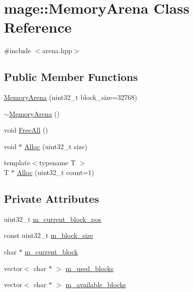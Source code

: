\hypertarget{classmage_1_1_memory_arena}{}\section{mage\+:\+:Memory\+Arena Class Reference}
\label{classmage_1_1_memory_arena}


{\ttfamily \#include $<$arena.\+hpp$>$}

\subsection*{Public Member Functions}
\begin{DoxyCompactItemize}
\item 
\hyperlink{classmage_1_1_memory_arena_aa243c458adb14e211f4dd944c4c82148}{Memory\+Arena} (uint32\+\_\+t block\+\_\+size=32768)
\item 
\hyperlink{classmage_1_1_memory_arena_acfee6fc205e2eaf6aeef4acf19948e6e}{$\sim$\+Memory\+Arena} ()
\item 
void \hyperlink{classmage_1_1_memory_arena_a30452ffc5813f5c62232713020fbe405}{Free\+All} ()
\item 
void $\ast$ \hyperlink{classmage_1_1_memory_arena_a01e00ac6e109249bd80a1e9e79eb0b28}{Alloc} (uint32\+\_\+t size)
\item 
{\footnotesize template$<$typename T $>$ }\\T $\ast$ \hyperlink{classmage_1_1_memory_arena_a16431dbfc49ddaee803fb0ab52303302}{Alloc} (uint32\+\_\+t count=1)
\end{DoxyCompactItemize}
\subsection*{Private Attributes}
\begin{DoxyCompactItemize}
\item 
uint32\+\_\+t \hyperlink{classmage_1_1_memory_arena_a3874097398455749a85fe50a9e4984c0}{m\+\_\+current\+\_\+block\+\_\+pos}
\item 
const uint32\+\_\+t \hyperlink{classmage_1_1_memory_arena_a41e318a8b32a9027e83aec25f09b3134}{m\+\_\+block\+\_\+size}
\item 
char $\ast$ \hyperlink{classmage_1_1_memory_arena_a13eba6e2a9f8d9db2df5674aa7ce0428}{m\+\_\+current\+\_\+block}
\item 
vector$<$ char $\ast$ $>$ \hyperlink{classmage_1_1_memory_arena_affb37aae6087014287b43d50521dd0fb}{m\+\_\+used\+\_\+blocks}
\item 
vector$<$ char $\ast$ $>$ \hyperlink{classmage_1_1_memory_arena_a2295aae794acabd26ef9c1ff4908b029}{m\+\_\+available\+\_\+blocks}
\end{DoxyCompactItemize}


